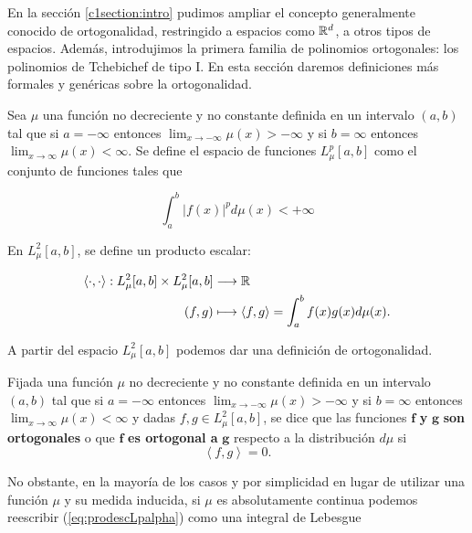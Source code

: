 En la sección \ref{c1section:intro} pudimos ampliar el concepto generalmente conocido de ortogonalidad, restringido a espacios como $\mathbb{R}^d$, a otros tipos de espacios. Además, introdujimos la primera familia de polinomios ortogonales: los polinomios de Tchebichef de tipo I. En esta sección daremos definiciones más formales y genéricas sobre la ortogonalidad.

Sea $\mu$ una función no decreciente y no constante definida en un intervalo $(a,b)$ tal que si $a=-\infty$ entonces $\displaystyle\lim_{x\rightarrow-\infty}\mu(x)>-\infty$ y si $b=\infty$ entonces $\displaystyle\lim_{x\rightarrow\infty}\mu(x)<\infty$. Se define el espacio de funciones $L_\mu^p[a,b]$ como el conjunto de funciones tales que

$$
\int_a^b |f(x)|^p d\mu(x) < +\infty
$$

En $L_\mu^2[a,b]$, se define un producto escalar:

\begin{equation}
    \label{eq:prodescLpalpha}
    \begin{split}
        \left\langle\cdot,\cdot\right\rangle:L_\mu^2[a,b]\times L_\mu^2[a,b] &\longrightarrow \mathbb{R} \\
        (f,g)&\longmapsto \left\langle f,g \right\rangle=\int_a^b f(x)g(x)d\mu(x).
    \end{split}
\end{equation}

A partir del espacio $L_\mu^2[a,b]$ podemos dar una definición de ortogonalidad.

\begin{definicion}[Ortogonalidad]

    Fijada una función $\mu$ no decreciente y no constante definida en un intervalo $(a,b)$ tal que si $a=-\infty$ entonces $\displaystyle\lim_{x\rightarrow-\infty}\mu(x)>-\infty$ y si $b=\infty$ entonces $\displaystyle\lim_{x\rightarrow\infty}\mu(x)<\infty$ y dadas $f,g\in L_\mu^2[a,b]$, se dice que las funciones $\mathbf f$ \textbf y $\mathbf g$ \textbf{son ortogonales} o que $\mathbf f$ \textbf{es ortogonal a} $\mathbf{g}$ respecto a la distribución $d\mu$ si
    \begin{equation}
        \label{eq:defortogonalidad}
        \left\langle f,g\right\rangle = 0.
    \end{equation}
\end{definicion}

No obstante, en la mayoría de los casos y por simplicidad en lugar de utilizar una función $\mu$ y su medida inducida, si $\mu$ es absolutamente continua podemos reescribir (\ref{eq:prodescLpalpha}) como una integral de Lebesgue

